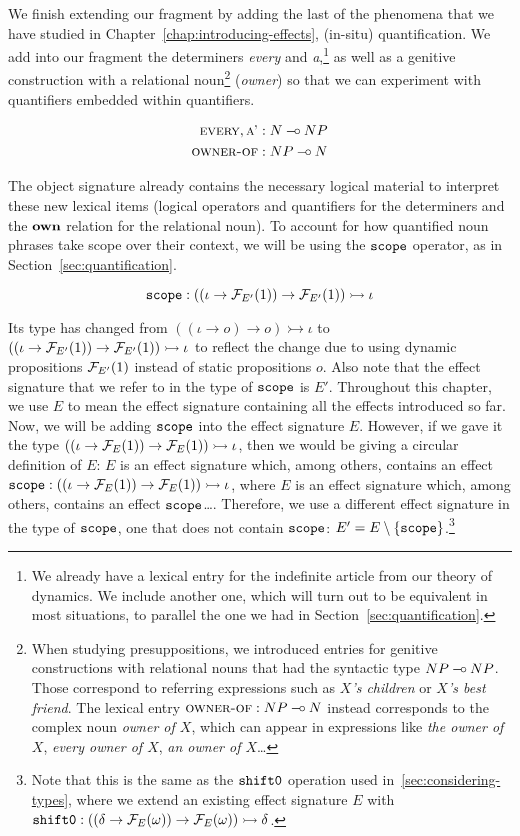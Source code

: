 We finish extending our fragment by adding the last of the phenomena that
we have studied in Chapter~\ref{chap:introducing-effects}, (in-situ)
quantification. We add into our fragment the determiners \emph{every} and
\emph{a},\footnote{We already have a lexical entry for the indefinite
  article from our theory of dynamics. We include another one, which will
  turn out to be equivalent in most situations, to parallel the one we had
  in Section~\ref{sec:quantification}.} as well as a genitive construction
with a relational noun\footnote{When studying presuppositions, we
  introduced entries for genitive constructions with relational nouns that
  had the syntactic type $NP \mathbin{{-}\mkern-3.5mu{\circ}} NP$. Those correspond to referring
  expressions such as \emph{$X$'s children} or \emph{$X$'s best
    friend}. The lexical entry $\textsc{owner-of} : NP \mathbin{{-}\mkern-3.5mu{\circ}} N$ instead
  corresponds to the complex noun \emph{owner of $X$}, which can appear in
  expressions like \emph{the owner of $X$}, \emph{every owner of $X$},
  \emph{an owner of $X$}\ldots} (\emph{owner}) so that we can experiment
with quantifiers embedded within quantifiers.

\begin{align*}
  \textsc{every}, \textsc{a'} &: N \mathbin{{-}\mkern-3.5mu{\circ}} NP \\
  \textsc{owner-of} &: NP \mathbin{{-}\mkern-3.5mu{\circ}} N
\end{align*}

The object signature already contains the necessary logical material to
interpret these new lexical items (logical operators and quantifiers for
the determiners and the $\textbf{own}$ relation for the relational noun). To
account for how quantified noun phrases take scope over their
context, we will be using the $\mathtt{scope}$ operator, as in
Section~\ref{sec:quantification}.

$$
\mathtt{scope} : ((\iota \to \mathcal{F}_{E'}(1)) \to \mathcal{F}_{E'}(1)) \rightarrowtail \iota
$$

Its type has changed from $((\iota \to o) \to o) \rightarrowtail \iota$ to
$((\iota \to \mathcal{F}_{E'}(1)) \to \mathcal{F}_{E'}(1)) \rightarrowtail \iota$ to
reflect the change due to using dynamic propositions $\mathcal{F}_{E'}(1)$ instead
of static propositions $o$. Also note that the effect signature that we
refer to in the type of $\mathtt{scope}$ is $E'$. Throughout this chapter, we
use $E$ to mean the effect signature containing all the effects introduced
so far. Now, we will be adding $\mathtt{scope}$ into the effect signature
$E$. However, if we gave it the type
$((\iota \to \mathcal{F}_E(1)) \to \mathcal{F}_E(1)) \rightarrowtail \iota$, then we would
be giving a circular definition of $E$: $E$ is an effect signature which,
among others, contains an effect
$\mathtt{scope} : ((\iota \to \mathcal{F}_E(1)) \to \mathcal{F}_E(1)) \rightarrowtail \iota$, where $E$ is
an effect signature which, among others, contains an effect
$\mathtt{scope}$\ldots. Therefore, we use a different effect signature in the
type of $\mathtt{scope}$, one that does not contain $\mathtt{scope}$:
$E' = E \setminus \{\mathtt{scope}\}$.\footnote{Note that this is the same as
  the $\mathtt{shift0}$ operation used in~\ref{sec:considering-types}, where we
  extend an existing effect signature $E$ with
  $\mathtt{shift0} : ((\delta \to \mathcal{F}_E(\omega)) \to
    \mathcal{F}_E(\omega)) \rightarrowtail \delta$.}

